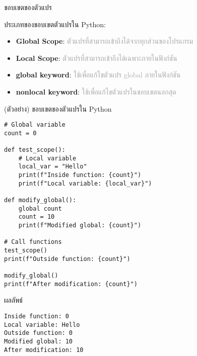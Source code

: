 \documentclass[12pt,a4paper]{article}
\newcommand{\textlight}[1]{{\thailightfont #1}}
\begin{document}
\hspace{1cm}\textlight{ขอบเขตของตัวแปร (Variable Scope) กำหนดว่าตัวแปรสามารถเข้าถึงได้จากส่วนไหนของโปรแกรม ใน Python มีขอบเขตหลัก 2 ประเภท คือ ขอบเขตทั่วไป (Global Scope) และขอบเขตท้องถิ่น (Local Scope)}

\begin{noticebox}{ขอบเขตของตัวแปร}

\textlight{ประเภทของขอบเขตตัวแปรใน Python:}

\begin{itemize}
    \item \textbf{Global Scope}: \textcolor{darkgray}{ตัวแปรที่สามารถเข้าถึงได้จากทุกส่วนของโปรแกรม}
    \item \textbf{Local Scope}: \textcolor{darkgray}{ตัวแปรที่สามารถเข้าถึงได้เฉพาะภายในฟังก์ชัน}
    \item \textbf{global keyword}: \textcolor{darkgray}{ใช้เพื่อแก้ไขตัวแปร global ภายในฟังก์ชัน}
    \item \textbf{nonlocal keyword}: \textcolor{darkgray}{ใช้เพื่อแก้ไขตัวแปรในขอบเขตนอกสุด}
\end{itemize}

\end{noticebox}

\begin{codebox}{(ตัวอย่าง) ขอบเขตของตัวแปรใน Python}
\begin{lstlisting}[style=python]
# Global variable
count = 0

def test_scope():
    # Local variable
    local_var = "Hello"
    print(f"Inside function: {count}")
    print(f"Local variable: {local_var}")

def modify_global():
    global count
    count = 10
    print(f"Modified global: {count}")

# Call functions
test_scope()
print(f"Outside function: {count}")

modify_global()
print(f"After modification: {count}")
\end{lstlisting}
\end{codebox}

\begin{resultbox}{ผลลัพธ์}
\begin{verbatim}
Inside function: 0
Local variable: Hello
Outside function: 0
Modified global: 10
After modification: 10
\end{verbatim}
\end{resultbox}

\vspace{6cm}
\end{document}
